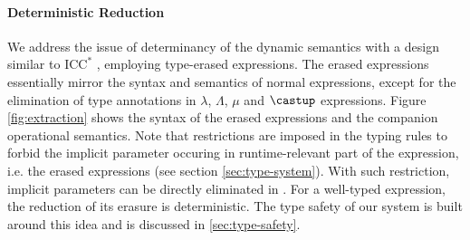 \paragraph{Deterministic Reduction}
We address the issue of determinancy of the dynamic semantics with
a design similar to $\mathrm{ICC}^*$ \cite{barras2008implicit},
employing type-erased expressions. The erased expressions
essentially mirror the syntax and semantics
of normal expressions, except for the elimination of type annotations in $\lambda$,
$\Lambda$, $\mu$ and $\castup$ expressions.
Figure \ref{fig:extraction} shows the syntax of the erased expressions and
the companion operational semantics. Note that restrictions are imposed in the
typing rules to forbid the implicit parameter occuring in runtime-relevant part
of the expression, i.e. the erased expressions (see section \ref{sec:type-system}).
With such restriction, implicit parameters can be directly eliminated in
. For a well-typed expression, the reduction of
its erasure is deterministic. The type safety of our system is built around
this idea and is discussed in \ref{sec:type-safety}.

